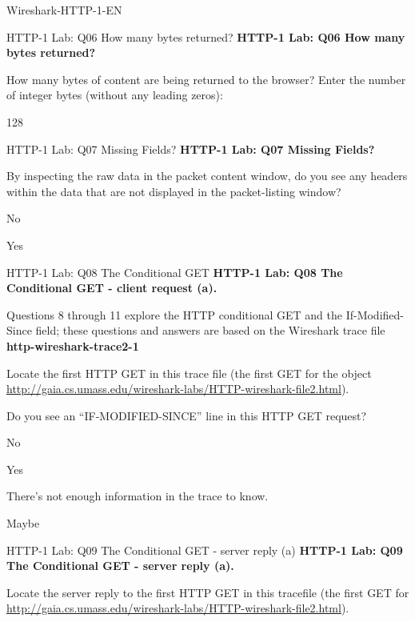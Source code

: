 \documentclass[a4paper]{article}
\begin{document}
\begin{quiz}{Wireshark-HTTP-1-EN}
\begin{shortanswer}[points=1]{HTTP-1 Lab: Q06 How many bytes returned?}
\textbf{HTTP-1 Lab: Q06 How many bytes returned?}

How many bytes of content are being returned to the browser? Enter the number of integer bytes (without any leading zeros): 
\item 128
\end{shortanswer}

\begin{multi}[points=1,shuffle]{HTTP-1 Lab: Q07 Missing Fields?}
\textbf{HTTP-1 Lab: Q07 Missing Fields?} 

By inspecting the raw data in the packet content window, do you see any headers within the data that are not displayed in the packet-listing window?
\item* No
\item Yes
\end{multi}

\begin{multi}[points=1,shuffle]{HTTP-1 Lab: Q08 The Conditional GET}
\textbf{HTTP-1 Lab: Q08 The Conditional GET - client request (a).} 

Questions 8 through 11 explore the HTTP conditional GET and the If-Modified-Since field; these questions and answers are based on the Wireshark trace file \textbf{http-wireshark-trace2-1}

Locate the first HTTP GET in this trace file (the first GET for the object \href{http://gaia.cs.umass.edu/wireshark-labs/HTTP-wireshark-file2.html}{http://gaia.cs.umass.edu/wireshark-labs/HTTP-wireshark-file2.html}).

Do you see an ``IF-MODIFIED-SINCE'' line in this HTTP GET request? 
\item* No
\item Yes
\item There's not enough information in the trace to know.
\item Maybe
\end{multi}

\begin{multi}[points=1,shuffle]{HTTP-1 Lab: Q09 The Conditional GET - server reply (a)}
\textbf{HTTP-1 Lab: Q09 The Conditional GET - server reply (a).} 

Locate the server reply to the first HTTP GET in this tracefile (the first GET for \href{http://gaia.cs.umass.edu/wireshark-labs/HTTP-wireshark-file2.html}{http://gaia.cs.umass.edu/wireshark-labs/HTTP-wireshark-file2.html}).


\end{multi}
\end{quiz}
\end{document}
